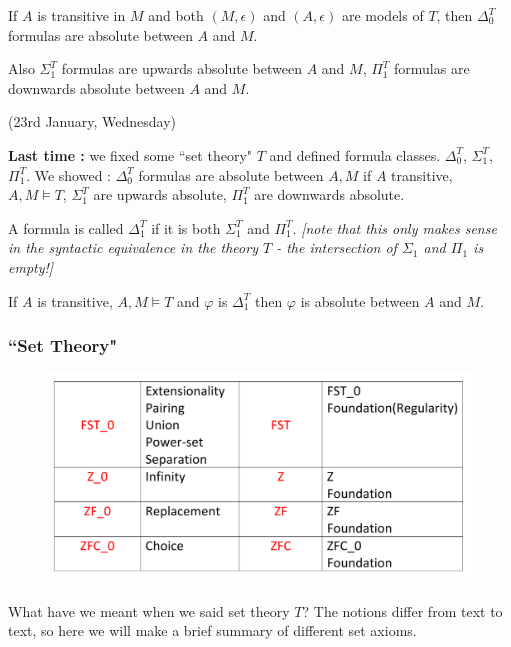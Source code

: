 \documentclass[12pt,a4paper]{article}
\begin{document}
\corr If $A$ is transitive in $M$ and both $(M, \epsilon)$ and $(A, \epsilon)$ are models of $T$, then $\Delta_0^T$ formulas are absolute between $A$ and $M$.

\quad Also $\Sigma_1^T$ formulas are upwards absolute between $A$ and $M$, $\Pi_1^T$ formulas are downwards absolute between $A$ and $M$. 
\s

\newday

(23rd January, Wednesday)
\s

\textbf{Last time :} we fixed some ``set theory" $T$ and defined formula classes. $\Delta_0^T$, $\Sigma_1^T$, $\Pi_1^T$. We showed : $\Delta_0^T$ formulas are absolute between $A,M$ if $A$ transitive, $A,M\models T$, $\Sigma_1^T$ are upwards absolute, $\Pi_1^T$ are downwards absolute.
\s

 A formula is called $\Delta_1^T$ if it is both $\Sigma_1^T$ and $\Pi_1^T$. \emph{[note that this only makes sense in the syntactic equivalence in the theory $T$ - the intersection of $\Sigma_1$ and $\Pi_1$ is empty!]}
\s

\corr If $A$ is transitive, $A,M\models T$ and $\varphi$ is $\Delta_1^T$ then $\varphi$ is absolute between $A$ and $M$.
\s

\subsubsection*{``Set Theory"}

\begin{figure}[h]
\begin{center}
    \includegraphics[scale=0.2]{1}
\end{center}
\end{figure}

What have we meant when we said set theory $T$? The notions differ from text to text, so here we will make a brief summary of different set axioms.
\s
\end{document}

